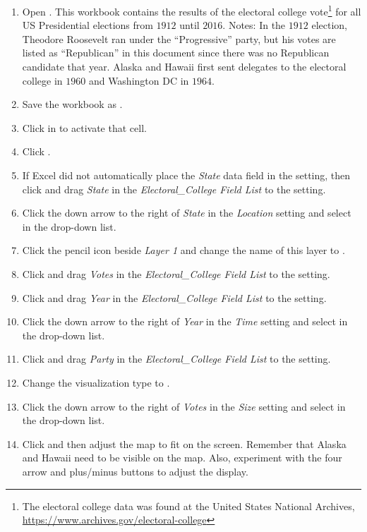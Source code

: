 \begin{enumerate}
	\item Open . This workbook contains the results of the electoral college vote\footnote{The electoral college data was found at the United States National Archives, \url{https://www.archives.gov/electoral-college}} for all US Presidential elections from $ 1912 $ until $ 2016 $. Notes: In the $ 1912 $ election, Theodore Roosevelt ran under the ``Progressive'' party, but his votes are listed as ``Republican'' in this document since there was no Republican candidate that year. Alaska and Hawaii first sent delegates to the electoral college in $ 1960 $ and Washington DC in $ 1964 $.
	\item Save the workbook as .
	\item Click in  to activate that cell.
	\item Click .
	\item If Excel did not automatically place the \textit{State} data field in the  setting, then click and drag \textit{State} in the \textit{Electoral\_College Field List} to the  setting. 
	\item Click the down arrow to the right of \textit{State} in the \textit{Location} setting and select  in the drop-down list.
	\item Click the pencil icon beside \textit{Layer 1} and change the name of this layer to .
	\item Click and drag \textit{Votes} in the \textit{Electoral\_College Field List} to the  setting.
	\item Click and drag \textit{Year} in the \textit{Electoral\_College Field List} to the  setting.
	\item Click the down arrow to the right of \textit{Year} in the \textit{Time} setting and select  in the drop-down list.
	\item Click and drag \textit{Party} in the \textit{Electoral\_College Field List} to the  setting.
	\item Change the visualization type to .
	\item Click the down arrow to the right of \textit{Votes} in the \textit{Size} setting and select  in the drop-down list.
	\item Click  and then adjust the map to fit on the screen. Remember that Alaska and Hawaii need to be visible on the map. Also, experiment with the four arrow and plus/minus buttons to adjust the display.

\end{enumerate}
